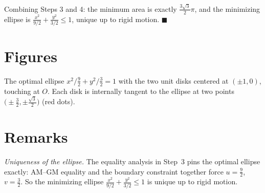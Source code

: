 \documentclass[11pt]{article}
\begin{document}
Combining Steps 3 and 4: the minimum area is exactly $\tfrac{3\sqrt3}{2}\pi$, and the minimizing
ellipse is $\tfrac{x^2}{9/2}+\tfrac{y^2}{3/2}\le1$, unique up to rigid motion. $\blacksquare$

\section*{Figures}

\begin{center}
\end{center}

\noindent The optimal ellipse $x^2/\tfrac92+y^2/\tfrac32=1$ with the two unit disks
centered at $(\pm1,0)$, touching at $O$. Each disk is internally tangent to the ellipse at
two points $\bigl(\pm\tfrac32,\pm\tfrac{\sqrt3}{2}\bigr)$ (red dots).

\section*{Remarks}

\emph{Uniqueness of the ellipse.} The equality analysis in Step~3 pins the optimal ellipse exactly:
AM--GM equality and the boundary constraint together force $u=\tfrac92$, $v=\tfrac32$. So the
minimizing ellipse $\tfrac{x^2}{9/2}+\tfrac{y^2}{3/2}\le1$ is unique up to rigid motion.
\end{document}
